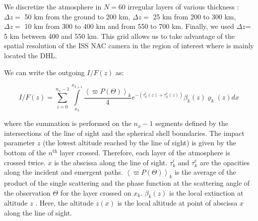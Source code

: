 We discretize the atmosphere in $N = 60$ irregular layers of various thickness : $\Delta z =$ 50 km from the
ground to 200 km, $\Delta z =$ 25 km from 200 to 300 km, $\Delta z =$ 10 km from 300 to 400 km and from 550 to 700 km.
Finally, we used $\Delta z$= 5 km between 400 and 550 km. This grid allows us to take advantage of the spatial resolution
of the ISS NAC camera in the region of interest where is mainly located the DHL.

We can write the outgoing $I/F (z)$ as:

\begin{equation}
I/F (z) = \sum_{i=0}^{n_x-1} \int\limits_{x_k}^{x_{k+1}}
\frac{\left< \varpi P(\Theta) \right>_k}{4}
e^{-\left( \tau^i_k\left(z\right) + \tau^e_k\left(z\right) \right)}
\beta_k\left(z\right) \varrho_k\left(z\right) d{x}
\label{eq:west2017_sup_limb}
\end{equation}

where the summation is performed on the $n_x-1$ segments defined by the intersections of the line of sight and the spherical shell boundaries. The impact parameter $z$ (the lowest altitude reached by the line of sight) is given by the bottom of the $n^\mathrm{th}$ layer crossed. Therefore, each layer of the atmosphere is crossed twice. $x$ is the abscissa along the line of sight. $\tau^i_k$ and $\tau^e_k$ are the opacities along the incident and emergent paths.
$\left< \varpi P(\Theta)\right>_k$ is the average of the product of the single scattering and the phase function at the scattering angle of the observation $\Theta$ for the layer crossed on $x_k$.  $\beta_k(z)$ is the local extinction  at altitude $z$ . Here, the altitude $z(x)$ is the local altitude at point of abscissa $x$ along the line of sight.


